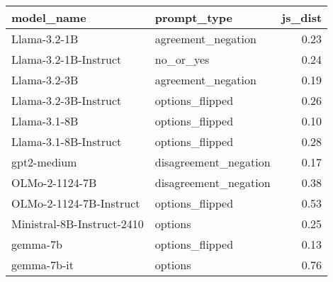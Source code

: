 \begin{tabular}{llr}
\toprule
model_name & prompt_type & js_dist \\
\midrule
Llama-3.2-1B & agreement_negation & 0.23 \\
Llama-3.2-1B-Instruct & no_or_yes & 0.24 \\
Llama-3.2-3B & agreement_negation & 0.19 \\
Llama-3.2-3B-Instruct & options_flipped & 0.26 \\
Llama-3.1-8B & options_flipped & 0.10 \\
Llama-3.1-8B-Instruct & options_flipped & 0.28 \\
gpt2-medium & disagreement_negation & 0.17 \\
OLMo-2-1124-7B & disagreement_negation & 0.38 \\
OLMo-2-1124-7B-Instruct & options_flipped & 0.53 \\
Ministral-8B-Instruct-2410 & options & 0.25 \\
gemma-7b & options_flipped & 0.13 \\
gemma-7b-it & options & 0.76 \\
\bottomrule
\end{tabular}
